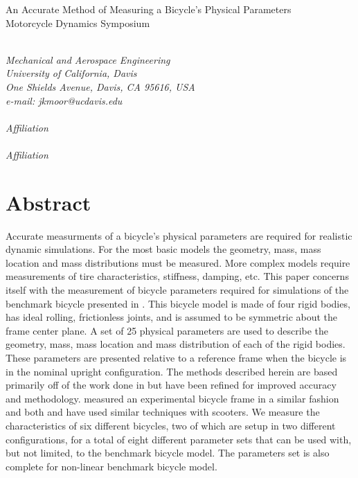 \documentclass{bmd2010a}
\begin{document}
\begin{flushleft}
{\fontsize{16pt}{20pt}\selectfont%
  An Accurate Method of Measuring a Bicycle's Physical Parameters\\}
{\fontsize{16pt}{20pt}\selectfont%
  Motorcycle Dynamics Symposium\\}
\end{flushleft}

\begin{flushleft}
  {\\}
  \textit{Mechanical and Aerospace Engineering\\
          University of California, Davis\\
          One Shields Avenue, Davis, CA 95616, USA\\
          e-mail: jkmoor@ucdavis.edu
}\vspace{10pt}\\
  {\\}
  \textit{Affiliation}\vspace{10pt}\\
  {\\}
  \textit{Affiliation}\vspace{10pt}\\
\end{flushleft}

\section*{Abstract}
Accurate measurments of a bicycle's physical parameters are required for
realistic dynamic simulations. For the most basic models the geometry, mass,
mass location and mass distributions must be measured. More complex models
require measurements of tire characteristics, stiffness, damping, etc. This
paper concerns itself with the measurement of bicycle parameters required for
simulations of the benchmark bicycle presented in \cite{Meijaard2007}. This
bicycle model is made of four rigid bodies, has ideal rolling, frictionless joints,
and is assumed to be symmetric about the frame center plane. A set of 25
physical parameters are used to describe the geometry, mass, mass location and
mass distribution of each of the rigid bodies. These parameters are presented
relative to a reference frame when the bicycle is in the nominal upright
configuration. The methods described herein are based primarily off of the work
done in \cite{Kooijman2006} but have been refined for improved accuracy and
methodology. \cite{Roland1971} measured an experimental bicycle frame in a
similar fashion and both \cite{Dohring1953} and \cite{Singh1971} have used
similar techniques with scooters. We measure the characteristics of six
different bicycles, two of which are setup in two different configurations, for
a total of eight different parameter sets that can be used with, but not
limited, to the benchmark bicycle model. The parameters set is also complete
for non-linear benchmark bicycle model.
\end{document}
